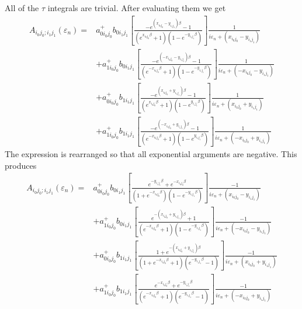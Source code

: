 All of the $\tau$ integrals are trivial.  After evaluating
them we get
\begin{equation}
\begin{split}
A_{i_0 j_0; i_1 j_1}(\varepsilon_n) = &
a^+_{0 i_0 j_0} b_{0 i_1 j_1}
\left[ \frac{-e^{(x_{i_0 j_0} - y_{i_1 j_1})\beta} - 1}
{(e^{x_{i_0 j_0}\beta} + 1)(1 - e^{- y_{i_1 j_1} \beta})}
\right] \frac{1}{i\varepsilon_n + (x_{i_0 j_0} - y_{i_1 j_1})} \\
 &
+ a^+_{1 i_0 j_0} b_{0 i_1 j_1}
\left[ \frac{-e^{(-x_{i_0 j_0} - y_{i_1 j_1})\beta} - 1}
{(e^{-x_{i_0 j_0}\beta} + 1)(1 - e^{- y_{i_1 j_1} \beta})}
\right] \frac{1}{i\varepsilon_n + (-x_{i_0 j_0} - y_{i_1 j_1})} \\
 &
+ a^+_{0 i_0 j_0} b_{1 i_1 j_1}
\left[ \frac{-e^{(x_{i_0 j_0} + y_{i_1 j_1})\beta} - 1}
{(e^{x_{i_0 j_0}\beta} + 1)(1 - e^{y_{i_1 j_1} \beta})}
\right] \frac{1}{i\varepsilon_n + (x_{i_0 j_0} + y_{i_1 j_1})} \\
&
+ a^+_{1 i_0 j_0} b_{1 i_1 j_1}
\left[ \frac{-e^{(-x_{i_0 j_0} + y_{i_1 j_1})\beta} - 1}
{(e^{-x_{i_0 j_0}\beta} + 1)(1 - e^{y_{i_1 j_1} \beta})}
\right] \frac{1}{i\varepsilon_n + (-x_{i_0 j_0} + y_{i_1 j_1})}
\end{split}
\end{equation}
The expression is rearranged so that all exponential arguments
are negative.  This produces
\begin{equation}
\begin{split}
A_{i_0 j_0; i_1 j_1}(\varepsilon_n) = &
a^+_{0 i_0 j_0} b_{0 i_1 j_1}
\left[ \frac{e^{- y_{i_1 j_1}\beta} + e^{-x_{i_0 j_0}\beta}}
{(1+e^{-x_{i_0 j_0}\beta})(1 - e^{- y_{i_1 j_1} \beta})}
\right] \frac{-1}{i\varepsilon_n + (x_{i_0 j_0} - y_{i_1 j_1})} \\
 &
+ a^+_{1 i_0 j_0} b_{0 i_1 j_1}
\left[ \frac{e^{-(x_{i_0 j_0} + y_{i_1 j_1})\beta} + 1}
{(e^{-x_{i_0 j_0}\beta} + 1)(1 - e^{- y_{i_1 j_1} \beta})}
\right] \frac{-1}{i\varepsilon_n + (-x_{i_0 j_0} - y_{i_1 j_1})} \\
 &
+ a^+_{0 i_0 j_0} b_{1 i_1 j_1}
\left[ \frac{1+e^{-(x_{i_0 j_0} + y_{i_1 j_1})\beta}}
{(1+e^{-x_{i_0 j_0}\beta} + 1)(e^{-y_{i_1 j_1} \beta}-1)}
\right] \frac{-1}{i\varepsilon_n + (x_{i_0 j_0} + y_{i_1 j_1})} \\
&
+ a^+_{1 i_0 j_0} b_{1 i_1 j_1}
\left[ \frac{e^{-x_{i_0 j_0}\beta} + e^{-y_{i_1 j_1}\beta}}
{(e^{-x_{i_0 j_0}\beta} + 1)(e^{-y_{i_1 j_1} \beta}-1)}
\right] \frac{-1}{i\varepsilon_n + (-x_{i_0 j_0} + y_{i_1 j_1})}
\end{split}
\end{equation}

